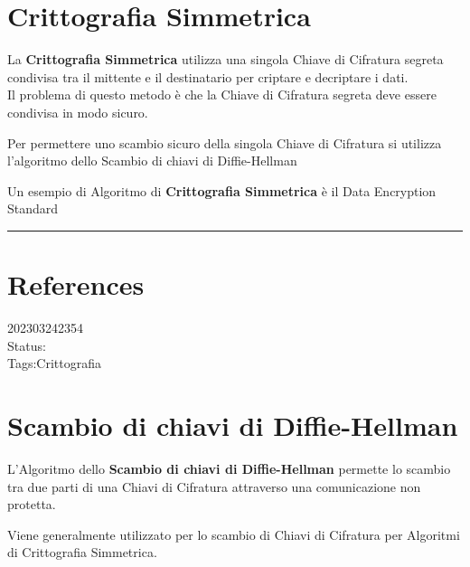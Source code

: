 \documentclass[
]{article}
\begin{document}
\hypertarget{crittografia-simmetrica}{%
\section{Crittografia Simmetrica}\label{crittografia-simmetrica}}

La \textbf{Crittografia Simmetrica} utilizza una singola Chiave di
Cifratura segreta condivisa tra il mittente e il destinatario per
criptare e decriptare i dati.\\
Il problema di questo metodo è che la Chiave di Cifratura segreta deve
essere condivisa in modo sicuro.

Per permettere uno scambio sicuro della singola Chiave di Cifratura si
utilizza l'algoritmo dello Scambio di chiavi di Diffie-Hellman

Un esempio di Algoritmo di \textbf{Crittografia Simmetrica} è il Data
Encryption Standard

\begin{center}\rule{0.5\linewidth}{0.5pt}\end{center}

\hypertarget{references-7}{%
\section{References}\label{references-7}}

\hfill\break

202303242354\\
Status:\\
Tags:Crittografia

\hypertarget{scambio-di-chiavi-di-diffie-hellman}{%
\section{Scambio di chiavi di
Diffie-Hellman}\label{scambio-di-chiavi-di-diffie-hellman}}

L'Algoritmo dello \textbf{Scambio di chiavi di Diffie-Hellman} permette
lo scambio tra due parti di una Chiavi di Cifratura attraverso una
comunicazione non protetta.

Viene generalmente utilizzato per lo scambio di Chiavi di Cifratura per
Algoritmi di Crittografia Simmetrica.
\end{document}
